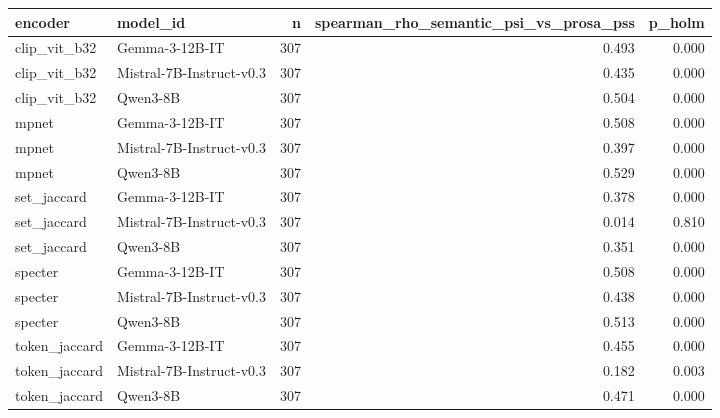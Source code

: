 \begin{tabular}{llrrr}
\toprule
encoder & model\_id & n & spearman\_rho\_semantic\_psi\_vs\_prosa\_pss & p\_holm \\
\midrule
clip\_vit\_b32 & Gemma-3-12B-IT & 307 & 0.493 & 0.000 \\
clip\_vit\_b32 & Mistral-7B-Instruct-v0.3 & 307 & 0.435 & 0.000 \\
clip\_vit\_b32 & Qwen3-8B & 307 & 0.504 & 0.000 \\
mpnet & Gemma-3-12B-IT & 307 & 0.508 & 0.000 \\
mpnet & Mistral-7B-Instruct-v0.3 & 307 & 0.397 & 0.000 \\
mpnet & Qwen3-8B & 307 & 0.529 & 0.000 \\
set\_jaccard & Gemma-3-12B-IT & 307 & 0.378 & 0.000 \\
set\_jaccard & Mistral-7B-Instruct-v0.3 & 307 & 0.014 & 0.810 \\
set\_jaccard & Qwen3-8B & 307 & 0.351 & 0.000 \\
specter & Gemma-3-12B-IT & 307 & 0.508 & 0.000 \\
specter & Mistral-7B-Instruct-v0.3 & 307 & 0.438 & 0.000 \\
specter & Qwen3-8B & 307 & 0.513 & 0.000 \\
token\_jaccard & Gemma-3-12B-IT & 307 & 0.455 & 0.000 \\
token\_jaccard & Mistral-7B-Instruct-v0.3 & 307 & 0.182 & 0.003 \\
token\_jaccard & Qwen3-8B & 307 & 0.471 & 0.000 \\
\bottomrule
\end{tabular}
